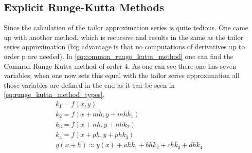 \subsection{Explicit Runge-Kutta Methods}
Since the calculation of the tailor approximation series is quite tedious. One came up with another method, which is recursive and results in the same as the tailor series approximation (big advantage is that no computations of derivatives up to order p are needed). In \autoref{eq:common_runge_kutta_method} one can find the Common Runge-Kutta method of order 4. As one can see there one has seven variables, when one now sets this equal with the tailor series approximation all those variables are defined in the end as it can be seen in \autoref{eq:runge_kutta_method_types}.
\begin{equation}\label{eq:common_runge_kutta_method}
\begin{aligned}
& k_1=f(x, y) \\
& k_2=f\left(x+m h, y+m h k_1\right) \\
& k_3=f\left(x+n h, y+n h k_2\right) \\
& k_4=f\left(x+p h, y+p h k_3\right) \\
& y(x+h) \approx y(x)+a h k_1+b h k_2+c h k_3+d h k_4 \\
&
\end{aligned}
\end{equation}


